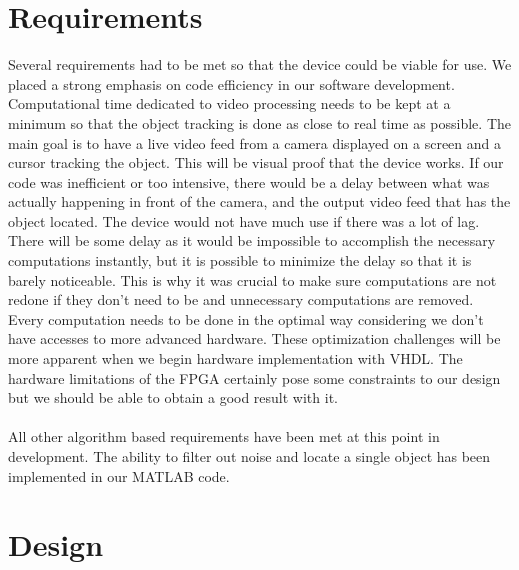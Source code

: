 \documentclass[12pt]{article} %
\begin{document}
\section{Requirements}
Several requirements had to be met so that the device could be viable for use. We placed a strong emphasis on code efficiency in our software development. Computational time dedicated to video processing needs to be kept at a minimum so that the object tracking is done as close to real time as possible. The main goal is to have a live video feed from a camera displayed on a screen and a cursor tracking the object. This will be visual proof that the device works. If our code was inefficient or too intensive, there would be a delay between what was actually happening in front of the camera, and the output video feed that has the object located. The device would not have much use if there was a lot of lag. There will be some delay as it would be impossible to accomplish the necessary computations instantly, but it is possible to minimize the delay so that it is barely noticeable. This is why it was crucial to make sure computations are not redone if they don't need to be and unnecessary computations are removed. Every computation needs to be done in the optimal way considering we don't have accesses to more advanced hardware. These optimization challenges will be more apparent when we begin hardware implementation with VHDL. The hardware limitations of the FPGA certainly pose some constraints to our design but we should be able to obtain a good result with it. \\\\
All other algorithm based requirements have been met at this point in development. The ability to filter out noise and locate a single object has been implemented in our MATLAB code. 
\section{Design}
\end{document}

